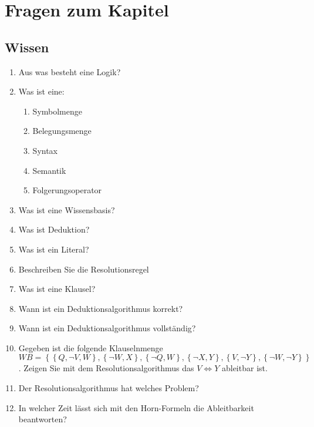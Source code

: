 \section{Fragen zum Kapitel}
\subsection{Wissen}
\begin{enumerate}
	\item Aus was besteht eine Logik?
	\item Was ist eine:
	\begin{enumerate}
		\item Symbolmenge
		\item Belegungsmenge
		\item Syntax
		\item Semantik
		\item Folgerungsoperator
	\end{enumerate}

  \item Was ist eine Wissensbasis?
	\item Was ist Deduktion?
	\item Was ist ein Literal?
	\item Beschreiben Sie die Resolutionsregel
	\item Was ist eine Klausel?
	\item Wann ist ein Deduktionsalgorithmus korrekt?
	\item Wann ist ein Deduktionsalgorithmus vollständig?
	
	\item Gegeben ist die folgende Klauselnmenge $WB=\left\{\left\{Q,\neg V,W\right\},\left\{\neg W,X\right\},\left\{\neg Q,W\right\},\left\{\neg X,Y\right\},\left\{V,\neg Y\right\},\left\{\neg W,\neg Y\right\}\right\}$. Zeigen Sie mit dem Resolutionsalgorithmus das $V\Leftrightarrow Y$ ableitbar ist.
	
	\item Der Resolutionsalgorithmus hat welches Problem?
	
	\item In welcher Zeit lässt sich mit den Horn-Formeln die Ableitbarkeit beantworten?
	

\end{enumerate}
